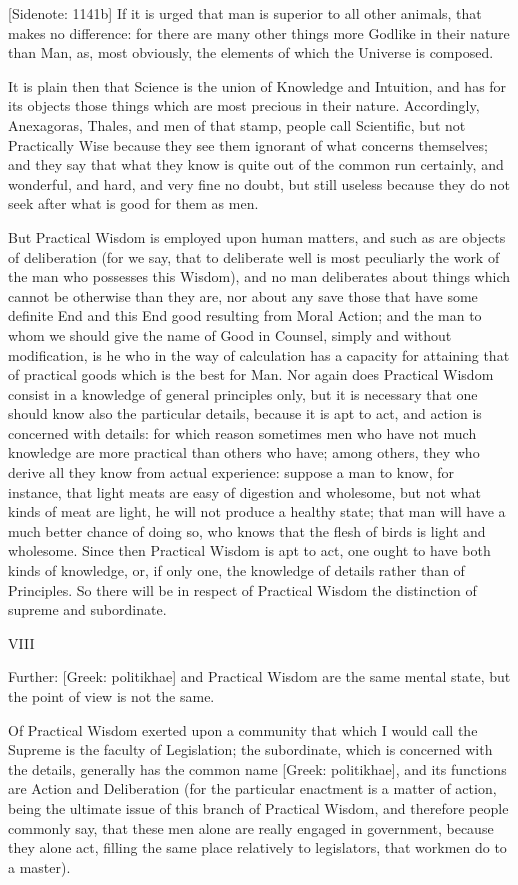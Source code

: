 [Sidenote: 1141b] If it is urged that man is superior to all other
animals, that makes no difference: for there are many other things more
Godlike in their nature than Man, as, most obviously, the elements of
which the Universe is composed.

It is plain then that Science is the union of Knowledge and Intuition,
and has for its objects those things which are most precious in their
nature. Accordingly, Anexagoras, Thales, and men of that stamp, people
call Scientific, but not Practically Wise because they see them ignorant
of what concerns themselves; and they say that what they know is quite
out of the common run certainly, and wonderful, and hard, and very fine
no doubt, but still useless because they do not seek after what is good
for them as men.

But Practical Wisdom is employed upon human matters, and such as are
objects of deliberation (for we say, that to deliberate well is most
peculiarly the work of the man who possesses this Wisdom), and no man
deliberates about things which cannot be otherwise than they are, nor
about any save those that have some definite End and this End good
resulting from Moral Action; and the man to whom we should give the name
of Good in Counsel, simply and without modification, is he who in the
way of calculation has a capacity for attaining that of practical goods
which is the best for Man. Nor again does Practical Wisdom consist in
a knowledge of general principles only, but it is necessary that one
should know also the particular details, because it is apt to act, and
action is concerned with details: for which reason sometimes men who
have not much knowledge are more practical than others who have; among
others, they who derive all they know from actual experience: suppose a
man to know, for instance, that light meats are easy of digestion and
wholesome, but not what kinds of meat are light, he will not produce a
healthy state; that man will have a much better chance of doing so,
who knows that the flesh of birds is light and wholesome. Since then
Practical Wisdom is apt to act, one ought to have both kinds of
knowledge, or, if only one, the knowledge of details rather than
of Principles. So there will be in respect of Practical Wisdom the
distinction of supreme and subordinate.

VIII

Further: [Greek: politikhae] and Practical Wisdom are the same mental
state, but the point of view is not the same.

Of Practical Wisdom exerted upon a community that which I would call
the Supreme is the faculty of Legislation; the subordinate, which is
concerned with the details, generally has the common name [Greek:
politikhae], and its functions are Action and Deliberation (for the
particular enactment is a matter of action, being the ultimate issue of
this branch of Practical Wisdom, and therefore people commonly say, that
these men alone are really engaged in government, because they alone
act, filling the same place relatively to legislators, that workmen do
to a master).

